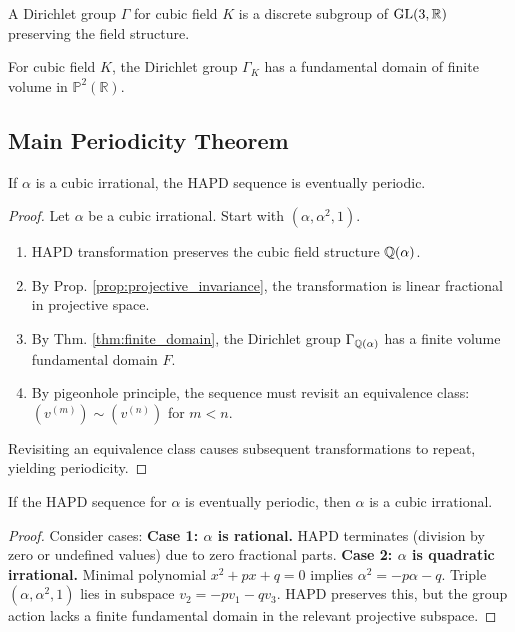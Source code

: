 \begin{definition}
A Dirichlet group $\Gamma$ for cubic field $K$ is a discrete subgroup of $\operatorname{GL}(3,\mathbb{R})$ preserving the field structure.
\end{definition}

\begin{theorem}\label{thm:finite_domain}
For cubic field $K$, the Dirichlet group $\Gamma_K$ has a fundamental domain of finite volume in $\mathbb{P}^2(\mathbb{R})$.
\end{theorem}

\subsection{Main Periodicity Theorem}

\begin{theorem}\label{thm:cubic_periodic}
If $\alpha$ is a cubic irrational, the HAPD sequence is eventually periodic.
\end{theorem}

\begin{proof}
Let $\alpha$ be a cubic irrational. Start with $(\alpha, \alpha^2, 1)$.
\begin{enumerate}
    \item HAPD transformation preserves the cubic field structure $\mathbb{Q}(\alpha)$.
    \item By Prop. \ref{prop:projective_invariance}, the transformation is linear fractional in projective space.
    \item By Thm. \ref{thm:finite_domain}, the Dirichlet group $\Gamma_{\mathbb{Q}(\alpha)}$ has a finite volume fundamental domain $F$.
    \item By pigeonhole principle, the sequence must revisit an equivalence class: $(v^{(m)}) \sim (v^{(n)})$ for $m < n$.
\end{enumerate}
Revisiting an equivalence class causes subsequent transformations to repeat, yielding periodicity.
\end{proof}

\begin{theorem}\label{thm:only_cubic_periodic}
If the HAPD sequence for $\alpha$ is eventually periodic, then $\alpha$ is a cubic irrational.
\end{theorem}

\begin{proof}
Consider cases:
\textbf{Case 1: $\alpha$ is rational.} HAPD terminates (division by zero or undefined values) due to zero fractional parts.
\textbf{Case 2: $\alpha$ is quadratic irrational.} Minimal polynomial $x^2+px+q=0$ implies $\alpha^2 = -p\alpha - q$. Triple $(\alpha, \alpha^2, 1)$ lies in subspace $v_2 = -pv_1 - qv_3$. HAPD preserves this, but the group action lacks a finite fundamental domain in the relevant projective subspace.
\end{proof}
